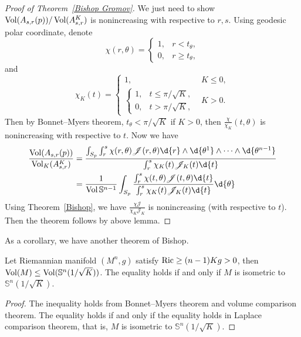 \begin{proof}[Proof of Theorem~\ref{Bishop Gromov}]
    We just need to show $\operatorname{Vol}(A_{s,r}(p))/\operatorname{Vol}(A_{s,r}^K)$ is nonincreasing with respective to $r,s$.
    Using geodesic polar coordinate, denote
    \[\chi(r,\theta)=\begin{cases}
        1, & r<t_\theta,\\
        0, & r\geq t_\theta,
    \end{cases}\]
    and
    \[\chi_K(t)=\begin{cases}
        1, & K\leq 0,\\
        \begin{cases}
            1, & t\leq\pi/\sqrt{K},\\
            0, & t>\pi/\sqrt{K},
        \end{cases} & K>0.
    \end{cases}\]
    Then by Bonnet--Myers theorem, $t_\theta<\pi/\sqrt{K}$ if $K>0$, then $\frac{\chi}{\chi_K}(t,\theta)$ is nonincreasing with respective to $t$.
    Now we have
    \begin{align*}
        \frac{\Vol(A_{s,r}(p))}{\Vol_K(A^K_{s,r})}&=\frac{\int_{S_p}\int_r^s\chi(r,\theta)\mathscr{J}(r,\theta)\d{r}\wedge\d{\theta^1}\wedge\cdots\wedge\d{\theta^{n-1}}}{\int_r^s\chi_K(t)\mathscr{J}_K(t)\d{t}}\\
        &=\frac{1}{\Vol{\mathbb{S}^{n-1}}}\int_{S_p}\frac{\int_r^s\chi(t,\theta)\mathscr{J}(t,\theta)\d{t}}{\int_r^s\chi_K(t)\mathscr{J}_K(t)\d{t}}\d{\theta}
    \end{align*}
    Using Theorem~\ref{Bishop}, we have $\frac{\chi\mathscr{J}}{\chi_K\mathscr{J}_K}$ is nonincreasing (with respective to $t$).
    Then the theorem follows by above lemma.
\end{proof}

As a corollary, we have another theorem of Bishop.
\begin{thm}[Bishop]
    Let Riemannian manifold $(M^n,g)$ satisfy $\operatorname{Ric}\geq(n-1)Kg>0$, then $\operatorname{Vol}(M)\leq\operatorname{Vol}(\mathbb{S}^n(1/\sqrt{K}))$.
    The equality holds if and only if $M$ is isometric to $\mathbb{S}^n(1/\sqrt{K})$.
\end{thm}
\begin{proof}
    The inequality holds from Bonnet--Myers theorem and volume comparison theorem.
    The equality holds if and only if the equality holds in Laplace comparison theorem, that is, $M$ is isometric to $\mathbb{S}^n(1/\sqrt{K})$.
\end{proof}

